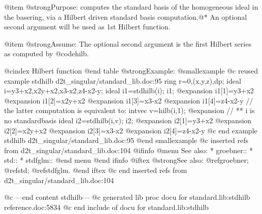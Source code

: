 {{{{{{{@item @strong{Purpose:}
computes the standard basis of the homogeneous ideal in the basering,
via a Hilbert driven standard basis computation.@*
An optional second argument will be used as 1st Hilbert function.

@item @strong{Assume:}
The optional second argument is the first Hilbert series as computed
by @code{hilb}.

@cindex Hilbert function
@end table
@strong{Example:}
@smallexample
@c reused example stdhilb d2t_singular/standard_lib.doc:95 
   ring  r=0,(x,y,z),dp;
ideal i=y3+x2,x2y+x2,x3-x2,z4-x2-y;
ideal i1=stdhilb(i); i1;
@expansion{} i1[1]=y3+x2
@expansion{} i1[2]=x2y+x2
@expansion{} i1[3]=x3-x2
@expansion{} i1[4]=z4-x2-y
// the latter computation is equivalent to:
intvec v=hilb(i,1);
@expansion{} // ** i is no standardbasis
ideal i2=stdhilb(i,v); i2;
@expansion{} i2[1]=y3+x2
@expansion{} i2[2]=x2y+x2
@expansion{} i2[3]=x3-x2
@expansion{} i2[4]=z4-x2-y
@c end example stdhilb d2t_singular/standard_lib.doc:95
@end smallexample
@c inserted refs from d2t_singular/standard_lib.doc:104
@ifinfo
@menu
See also:
* groebner::
* std::
* stdfglm::
@end menu
@end ifinfo
@iftex
@strong{See also:}
@ref{groebner};
@ref{std};
@ref{stdfglm}.
@end iftex
@c end inserted refs from d2t_singular/standard_lib.doc:104

@c ---end content stdhilb---
@c generated lib proc docu for standard.lib:stdhilb reference.doc:5834 
@c end include of docu for standard.lib:stdhilb

}}}}}}}
